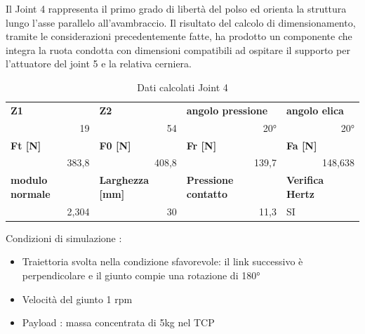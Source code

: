 \documentclass[%
corpo=11pt,
twoside,
 stile=classica,
oldstyle,
greek,%
]{toptesi}
\begin{document}
		Il Joint 4 rappresenta il primo grado di libertà del polso ed orienta la struttura lungo l'asse parallelo all'avambraccio. 
		Il risultato del calcolo di dimensionamento, tramite le considerazioni precedentemente fatte, ha prodotto un componente  che integra la ruota condotta con dimensioni compatibili ad ospitare il supporto per l'attuatore del joint 5 e la relativa cerniera.
		\begin{table}[H]
			\centering
			\caption{Dati calcolati Joint 4}
			\begin{tabular}{rrrl}
				\multicolumn{1}{l}{\textbf{Z1}} & \multicolumn{1}{l}{\textbf{Z2}} & \multicolumn{1}{l}{\textbf{angolo pressione}} & \textbf{angolo elica} \\
				19    & 54    & 20°    & \multicolumn{1}{r}{20°} \\
				\multicolumn{1}{l}{\textbf{Ft [N]}} & \multicolumn{1}{l}{\textbf{F0 [N]}} & \multicolumn{1}{l}{\textbf{Fr [N]}} & \textbf{Fa [N]} \\
				383,8 & 408,8 & 139,7 & \multicolumn{1}{r}{148,638} \\
				\multicolumn{1}{l}{\textbf{modulo normale}} & \multicolumn{1}{l}{\textbf{Larghezza [mm]}} & \multicolumn{1}{l}{\textbf{Pressione contatto}} & \textbf{Verifica Hertz} \\
				2,304 & 30    & 11,3  & SI \\
			\end{tabular}%
			\label{tab:lewis1}%
		\end{table}%
			Condizioni di simulazione :
		\begin{itemize} 
			\item Traiettoria svolta nella condizione sfavorevole: il link successivo è perpendicolare e il giunto compie una rotazione di 180° 
			\item Velocità del giunto 1 rpm
			\item Payload : massa concentrata di 5kg nel TCP 
		\end{itemize}
	
\end{document}
